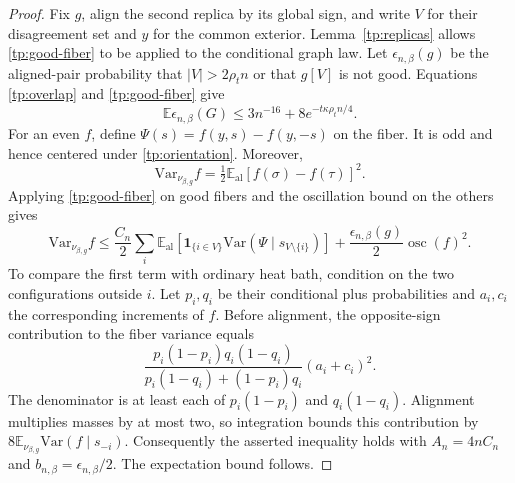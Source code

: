 \documentclass[11pt]{article}
\newcommand{\Var}{\mathrm{Var}}
\def\E{\mathbb{E}}
\numberwithin{equation}{section}
\begin{document}
\begin{proof}
Fix $g$, align the second replica by its global sign, and write $V$ for their disagreement set and $y$ for the common exterior. Lemma~\ref{tp:replicas} allows \eqref{tp:good-fiber} to be applied to the conditional graph law. Let $\epsilon_{n,\beta}(g)$ be the aligned-pair probability that $|V|>2\rho_tn$ or that $g[V]$ is not good. Equations \eqref{tp:overlap} and \eqref{tp:good-fiber} give
\[
 \E\epsilon_{n,\beta}(G)\le3n^{-16}+8e^{-t\kappa\rho_tn/4}.
\]
For an even $f$, define $\Psi(s)=f(y,s)-f(y,-s)$ on the fiber. It is odd and hence centered under \eqref{tp:orientation}. Moreover,
\[
 \Var_{\nu_{\beta,g}}f=\tfrac12\E_{\mathrm{al}}
              [f(\sigma)-f(\tau)]^2.
\]
Applying \eqref{tp:good-fiber} on good fibers and the oscillation bound on the others gives
\[
 \Var_{\nu_{\beta,g}}f\le\frac{C_n}{2}\sum_i
  \E_{\mathrm{al}}\!\left[\boldsymbol1_{\{i\in V\}}
      \Var(\Psi\mid s_{V\setminus\{i\}})\right]
       +\frac{\epsilon_{n,\beta}(g)}2\operatorname{osc}(f)^2.
\]
To compare the first term with ordinary heat bath, condition on the two configurations outside $i$. Let $p_i,q_i$ be their conditional plus probabilities and $a_i,c_i$ the corresponding increments of $f$. Before alignment, the opposite-sign contribution to the fiber variance equals
\[
 \frac{p_i(1-p_i)q_i(1-q_i)}{p_i(1-q_i)+(1-p_i)q_i}(a_i+c_i)^2.
\]
The denominator is at least each of $p_i(1-p_i)$ and $q_i(1-q_i)$. Alignment multiplies masses by at most two, so integration bounds this contribution by
$8\E_{\nu_{\beta,g}}\Var(f\mid s_{-i})$. Consequently the asserted inequality holds with $A_n=4nC_n$ and $b_{n,\beta}=\epsilon_{n,\beta}/2$. The expectation bound follows.
\end{proof}
\end{document}
